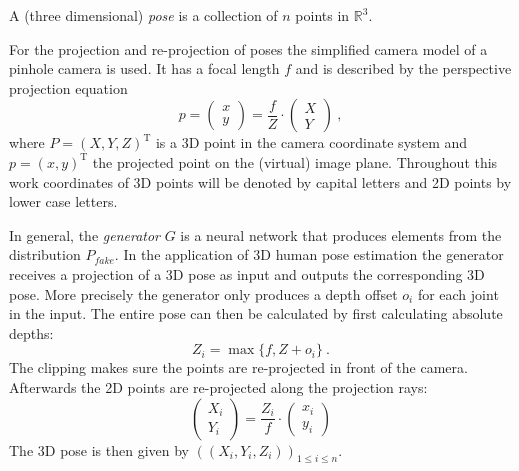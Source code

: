 

A (three dimensional) \textit{pose} is a collection of $n$ points in $\mathbb{R}^3$.

For the projection and re-projection of poses the simplified camera model of a pinhole camera is used.
It has a focal length $f$ and is described by the perspective projection equation
\begin{equation}
	\label{eq:perspective-projection}
	p = 
	\begin{pmatrix}
	x\\
	y
	\end{pmatrix}
	= \frac{f}{Z} \cdot 	
	\begin{pmatrix}
	X\\
	Y
	\end{pmatrix} \ ,
\end{equation}
where $P = (X, Y, Z)^\mathrm{T}$ is a 3D point in the camera coordinate system and $p = (x, y)^\mathrm{T}$ the projected point on the (virtual) image plane.
Throughout this work coordinates of 3D points will be denoted by capital letters and 2D points by lower case letters.

In general, the \textit{generator} $G$ is a neural network that produces  elements from the distribution $P_{fake}$.
In the application of 3D human pose estimation the generator receives a projection of a 3D pose as input and outputs the corresponding 3D pose.
More precisely the generator only produces a depth offset $o_i$ for each joint in the input.
The entire pose can then be calculated by first calculating absolute depths:
\begin{equation}
	Z_i = \max \{f, Z + o_i\} \ .
\end{equation}
The clipping makes sure the points are re-projected in front of the camera.
Afterwards the 2D points are re-projected along the projection rays:
\begin{equation}
	\label{eq:perspective-re-projection}
	\begin{pmatrix}
	X_i\\
	Y_i
	\end{pmatrix} = \frac{Z_i}{f} \cdot
	\begin{pmatrix}
	x_i\\
	y_i
	\end{pmatrix}
\end{equation} 
The 3D pose is then given by $\left(\left(X_i, Y_i, Z_i\right)\right)_{1\leq i \leq n}$.


